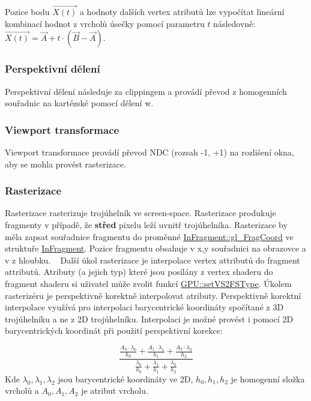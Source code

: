 Pozice bodu $ \overrightarrow{X(t)} $ a hodnoty dalších vertex atributů lze vypočítat lineární kombinací hodnot z vrcholů úsečky pomocí parametru $ t $ následovně\+: $ \overrightarrow{X(t)} = \overrightarrow{A} + t \cdot (\overrightarrow{B}-\overrightarrow{A}) $.\hypertarget{index_PerspectiveDivision}{}\subsubsection{Perspektivní dělení}\label{index_PerspectiveDivision}
Perspektivní dělení následuje za clippingem a provádí převod z homogenních souřadnic na kartézské pomocí dělení w. \hypertarget{index_ViewPortTransformation}{}\subsubsection{Viewport transformace}\label{index_ViewPortTransformation}
Viewport transformace provádí převod N\+DC (rozsah -\/1, +1) na rozlišení okna, aby se mohla provést rasterizace. \hypertarget{index_Rasterization}{}\subsubsection{Rasterizace}\label{index_Rasterization}
Rasterizace rasterizuje trojúhelník ve screen-\/space. Rasterizace produkuje fragmenty v případě, že {\bfseries střed} pixelu leží uvnitř trojúhelníka. Rasterizace by měla zapsat souřadnice fragmentu do proměnné \hyperlink{structInFragment_ae72e0b96e17181ea2cb2ef256e3f0a8f}{In\+Fragment\+::gl\+\_\+\+Frag\+Coord} ve struktuře \hyperlink{structInFragment}{In\+Fragment}. Pozice fragmentu obsahuje v x,y souřadnici na obrazovce a v z hloubku. ~\newline
 Další úkol rasterizace je interpolace vertex attributů do fragment attributů. Atributy (a jejich typ) které jsou posílány z vertex shaderu do fragment shaderu si uživatel může zvolit funkcí \hyperlink{group__program__tasks_gaff499d4f692ea0dd7125bfd324957619}{G\+P\+U\+::set\+V\+S2\+F\+S\+Type}. Úkolem rasterizéru je perspektivně korektně interpolovat atributy. Perspektivně korektní interpolace využívá pro interpolaci barycentrické koordináty spočítané z 3D trojúhelníku a ne z 2D trojúhelníku. Interpolaci je možné provést i pomocí 2D barycentrických koordinát při použití perspektivní korekce\+:

\[\displaystyle \frac{\frac{A_0 \cdot \lambda_0}{h_0} + \frac{A_1 \cdot \lambda_1}{h_1} + \frac{A_2 \cdot \lambda_2}{h_2}}{\frac{\lambda_0}{h_0}+\frac{\lambda_1}{h_1}+\frac{\lambda_2}{h_2}}\] Kde $\lambda_0,\lambda_1,\lambda_2$ jsou barycentrické koordináty ve 2D, $h_0,h_1,h_2$ je homogenní složka vrcholů a $A_0,A_1,A_2$ je atribut vrcholu.

